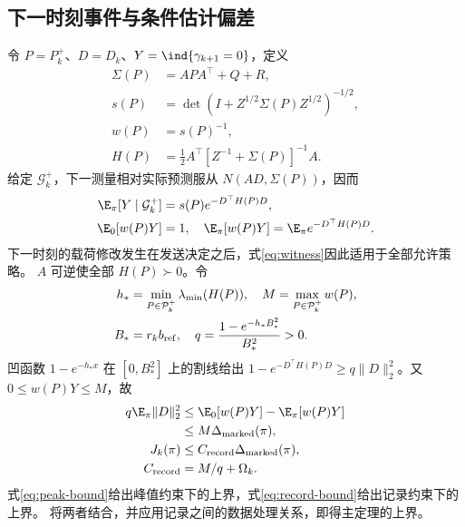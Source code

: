 \subsection{下一时刻事件与条件估计偏差}
令 $P=P_k^+$、$D=D_k$、$Y=\ind\{\gamma_{k+1}=0\}$，定义
\begin{equation}
 \begin{aligned}
 \Sigma(P)&=APA^\top+Q+R,\\
 s(P)&=\det(I+Z^{1/2}\Sigma(P)Z^{1/2})^{-1/2},\\
 w(P)&=s(P)^{-1},\\
 H(P)&=\tfrac12 A^\top[Z^{-1}+\Sigma(P)]^{-1}A.
 \end{aligned}
 \label{eq:witness-functions}
\end{equation}
给定 $\mathcal G_k^+$，下一测量相对实际预测服从 $N(AD,\Sigma(P))$，因而
\begin{equation}
 \begin{aligned}
 \E_\pi[Y\mid\mathcal G_k^+]&=s(P)e^{-D^\top H(P)D},\\
 \E_0[w(P)Y]&=1,\quad
 \E_\pi[w(P)Y]=\E_\pi e^{-D^\top H(P)D}.
 \end{aligned}
 \label{eq:witness}
\end{equation}
下一时刻的载荷修改发生在发送决定之后，式\eqref{eq:witness}因此适用于全部允许策略。
$A$ 可逆使全部 $H(P)\succ0$。令
\begin{equation}
 \begin{aligned}
 h_*&=\min_{P\in\mathcal P_k^+}\lambda_{\min}(H(P)),\quad
 M=\max_{P\in\mathcal P_k^+}w(P),\\
 B_*&=r_kb_{\rm ref},\quad q=\frac{1-e^{-h_*B_*^2}}{B_*^2}>0.
 \end{aligned}
 \label{eq:witness-constants}
\end{equation}
凹函数 $1-e^{-h_*x}$ 在 $[0,B_*^2]$ 上的割线给出
$1-e^{-D^\top H(P)D}\ge q\|D\|_2^2$。又 $0\le w(P)Y\le M$，故
\begin{equation}
 \begin{aligned}
 q\E_\pi\|D\|_2^2&\le\E_0[w(P)Y]-\E_\pi[w(P)Y]\\
 &\le M\Delta_{\rm marked}(\pi),\\
 J_k(\pi)&\le C_{\rm record}\Delta_{\rm marked}(\pi),\\
 C_{\rm record}&=M/q+\Omega_k.
 \end{aligned}
 \label{eq:record-bound}
\end{equation}
式\eqref{eq:peak-bound}给出峰值约束下的上界，式\eqref{eq:record-bound}给出记录约束下的上界。
将两者结合，并应用记录之间的数据处理关系，即得主定理的上界。

